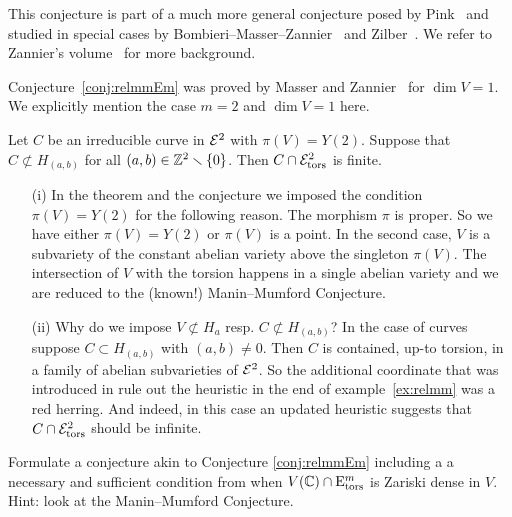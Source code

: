 This conjecture is part of a much more general conjecture posed by
Pink~\cite{Pink} and studied in special cases by
Bombieri--Masser--Zannier~\cite{BMZ,BMZgeometric} and
Zilber~\cite{Zilber}. We refer to Zannier's volume~\cite{ZannierBook}
for more background. 

Conjecture~\ref{conj:relmmEm} was proved by Masser and
Zannier~\cite{MZ:AJM10} for $\dim V = 1$. We explicitly mention the
case $m=2$ and $\dim V=1$ here.

\begin{theorem}
  Let $C$ be an irreducible curve in ${\mathcal E}^2$ with $\pi(V)=Y(2)$. 
  Suppose that $C\not\subset H_{(a,b)}$ for all
  $(a,b)\in{\mathbb{Z}}^2\smallsetminus\{0\}$. Then $C\cap {\mathcal E}^2_{\mathrm{tors}}$ is
  finite. 
\end{theorem}

\begin{remark}
  \begin{enumerate}
  \item [(i)]In the theorem and the conjecture we imposed the condition
    $\pi(V)=Y(2)$ for the following reason. The morphism $\pi$ is proper.
    So we  have either $\pi(V)=Y(2)$ or $\pi(V)$ is a point. In the second
    case, $V$ is a subvariety of the constant abelian variety above the
    singleton $\pi(V)$. The intersection of $V$ with the torsion happens
    in a single abelian variety and we  are reduced to the (known!)
    Manin--Mumford  Conjecture. 
  \item[(ii)] Why do we impose $V\not\subset H_a$ resp. $C\not\subset
    H_{(a,b)}$? In the case of curves suppose  $C\subset H_{(a,b)}$ with
    $(a,b)\not=0$.
    Then $C$ is contained, up-to torsion, in
    a family of abelian subvarieties of ${\mathcal E}^2$. So the additional
    coordinate that was introduced in rule out the heuristic in the
    end of example~\ref{ex:relmm} was a red herring. And indeed, in this case
    an updated heuristic  suggests that  $C\cap
    {\mathcal E}^2_{\mathrm{tors}}$ should be infinite. 
  \end{enumerate} 
\end{remark}


\begin{exercise} 
  Formulate a conjecture akin to Conjecture \ref{conj:relmmEm} including a
  a necessary and  sufficient condition from when $V({\mathbb{C}})\cap
  \mathrm{E}^m_{\mathrm{tors}}$ is Zariski dense in $V$. Hint: look at
  the Manin--Mumford Conjecture. 
\end{exercise}


